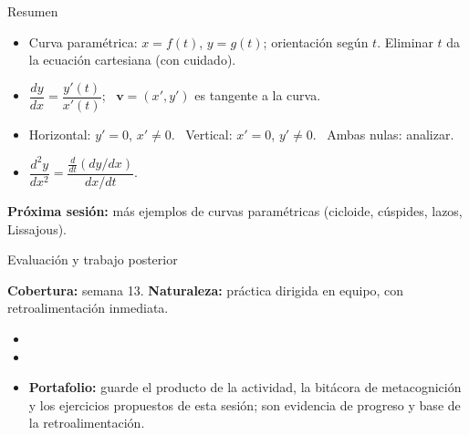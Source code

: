 \documentclass[10pt,aspectratio=169]{beamer}
\begin{document}
\begin{frame}{Resumen}
  \begin{itemize}
    \item Curva paramétrica: $x=f(t)$, $y=g(t)$; orientación según $t$. Eliminar $t$ da la ecuación cartesiana (con cuidado).
    \item $\dfrac{dy}{dx}=\dfrac{y'(t)}{x'(t)}$; \ $\mathbf v=(x',y')$ es tangente a la curva.
    \item Horizontal: $y'=0$, $x'\neq0$. \ Vertical: $x'=0$, $y'\neq0$. \ Ambas nulas: analizar.
    \item $\dfrac{d^2y}{dx^2}=\dfrac{\frac{d}{dt}(dy/dx)}{dx/dt}$.
  \end{itemize}
  \vspace{3mm}
  \textbf{Próxima sesión:} más ejemplos de curvas paramétricas (cicloide, cúspides, lazos, Lissajous).
\end{frame}


\begin{frame}{Evaluación y trabajo posterior}
  \small
  \begin{evalbox}
    \textbf{Cobertura:} semana 13. \textbf{Naturaleza:} práctica dirigida en equipo, con retroalimentación inmediata.
  \end{evalbox}
  \begin{itemize}
    \item \criterios
    \item \declaracionia
    \item \textbf{Portafolio:} guarde el producto de la actividad, la bitácora de metacognición y los ejercicios propuestos de esta sesión; son evidencia de progreso y base de la retroalimentación.
  \end{itemize}
\end{frame}
\end{document}
